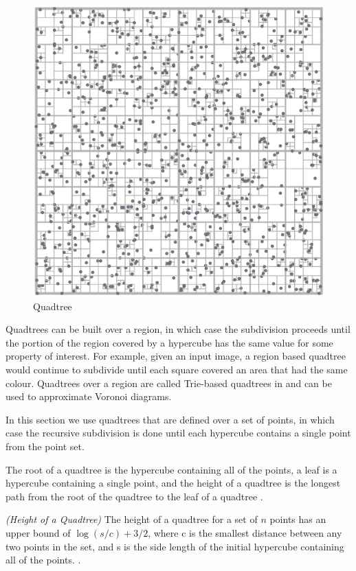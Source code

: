 \documentclass[mcs]{scsthesis}
\begin{document}
\begin{figure}
\begin{center}
\includegraphics[scale=0.35]{diagrams/quadtree.eps}
\caption{Quadtree}
\label{fig:quadtree}
\end{center}
\end{figure}

Quadtrees can be built over a region, in which case the subdivision proceeds
until the portion of the region covered by a hypercube has the same value for
some property of interest. For example, given an input image, a region based
quadtree would continue to subdivide until each square covered an area that 
had the same colour. Quadtrees over a region are called Trie-based quadtrees in
\cite{samet} and can be used to approximate Voronoi diagrams.

In this section we use quadtrees that are defined over a set of points, in which
case the recursive subdivision is done until each hypercube contains a single
point from the point set.

The root of a quadtree is the hypercube containing all of the points, a leaf
is a hypercube containing a single point, and the height of a quadtree
is the longest path from the root of the quadtree to the leaf of a quadtree
\cite{dutch}.

\begin{thm} \emph{(Height of a Quadtree)}
The height of a quadtree for a set of $n$ points has an upper bound of \(\log(s/c)
+ 3/2\), where c is the smallest distance between any two points in the set, and
s is the side length of the initial hypercube containing all of the points.
\cite{dutch}.
\end{thm}
\end{document}
